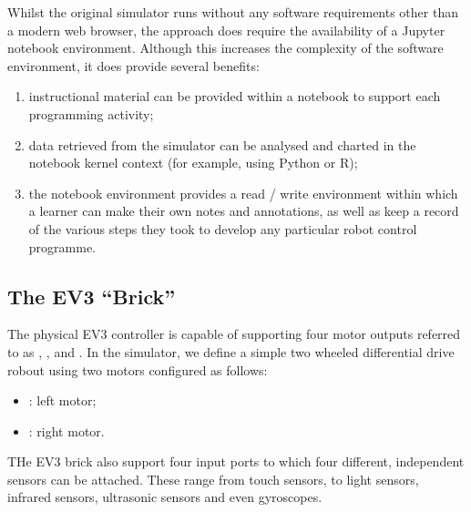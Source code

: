 \documentclass[letterpaper,10pt,english]{sphinxmanual}
\begin{document}
Whilst the original  simulator runs without any software requirements other than a modern web browser, the  approach does require the availability of a Jupyter notebook environment. Although this increases the complexity of the software environment, it does provide several benefits:
\begin{enumerate}
%
\item {} 
instructional material can be provided within a notebook to support each programming activity;

\item {} 
data retrieved from the simulator can be analysed and charted in the notebook kernel context (for example, using Python or R);

\item {} 
the notebook environment provides a read / write environment within which a learner can make their own notes and annotations, as well as keep a record of the various steps they took to develop any particular robot control programme.

\end{enumerate}


\subsection{The EV3 “Brick”}
\label{\detokenize{content/00_SOFTWARE_GUIDE/Section_00_02_ev3devsim_simulator_overview:The-EV3-_u201cBrick_u201d}}
The physical EV3 controller is capable of supporting four motor outputs referred to as , ,  and . In the simulator, we define a simple two wheeled differential drive robout using two motors configured as follows:
\begin{itemize}
\item {} 
: left motor;

\item {} 
: right motor.

\end{itemize}

THe EV3 brick also support four input ports to which four different, independent sensors can be attached. These range from touch sensors, to light sensors, infrared sensors, ultrasonic sensors and even gyroscopes.
\end{document}
